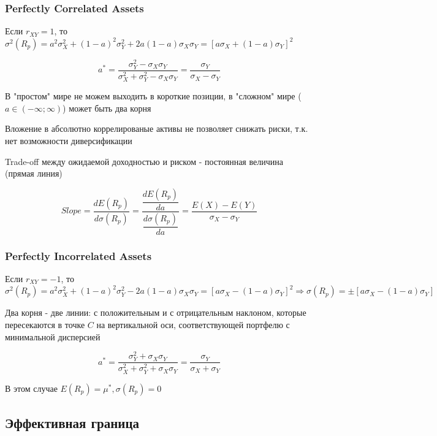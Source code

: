 \documentclass[a4paper,12pt]{article} %
\begin{document}
 \subsubsection{Perfectly Correlated Assets}
 
Если $ r_{XY}  = 1 $, то $   \sigma^2(R_p) = a^2\sigma^2_X + (1-a)^2\sigma^2_Y + 2 a(1-a) \sigma_X  \sigma_Y  = [a\sigma_X + (1-a)\sigma_Y]^2 $

  
  
  
    \[  a^{*} = \dfrac{ \sigma^2_Y -  \sigma_X  \sigma_Y  }{\sigma^2_X + \sigma^2_Y -  \sigma_X  \sigma_Y } =  \dfrac{ \sigma_Y  }{\sigma_X -    \sigma_Y }  \]
  
  
  В "простом" мире не можем выходить в короткие позиции, 
   в "сложном" мире ($ a \in (-\infty; \infty ) $) может быть два корня 
   
 
   
   
   Вложение в  абсолютно коррелированые активы не позволяет снижать риски, т.к. нет возможности диверсификации 
   
   Trade-off между ожидаемой  доходностью и  риском - постоянная величина (прямая линия)
   
   \[ 
   Slope =
   \dfrac{d E(R_p)}{d \sigma (R_p) } = \dfrac{\dfrac{d E(R_p)}{d a}}{\dfrac{d \sigma (R_p)}{da} } = \dfrac{E(X)-E(Y)}{\sigma_X - \sigma_Y } \]
   
    
   
   
   
   \subsubsection{Perfectly Incorrelated Assets}
   
   Если $ r_{XY}  = -1 $, то $   \sigma^2(R_p) = a^2\sigma^2_X + (1-a)^2\sigma^2_Y -  2 a(1-a) \sigma_X  \sigma_Y  = [a\sigma_X - (1-a)\sigma_Y]^2  \Rightarrow  \sigma(R_p)  = \pm [a\sigma_X - (1-a)\sigma_Y] $ 
      
  Два корня - две линии: с положительным и с отрицательным наклоном, которые  пересекаются в точке $ C $ на вертикальной оси,  соответствующей портфелю с минимальной  дисперсией
  
   \[  a^{*} = \dfrac{ \sigma^2_Y +  \sigma_X  \sigma_Y  }{\sigma^2_X + \sigma^2_Y +  \sigma_X  \sigma_Y } =  \dfrac{ \sigma_Y  }{\sigma_X +    \sigma_Y }  \]
   
   В этом случае $ E(R_p) = \mu^{*}, \sigma (R_p) =  0 $
  
  
   \subsection{Эффективная  граница} 
  
\end{document}
